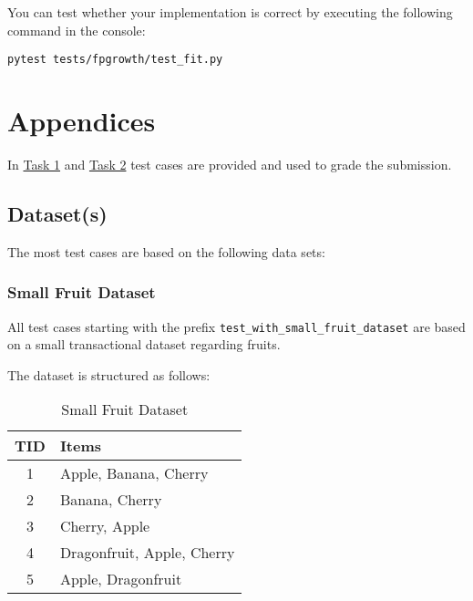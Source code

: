 \documentclass[
english,
smallborders
]{i6prcsht}
\begin{document}
You can test whether your implementation is correct by executing the following command in the console:

\vspace*{0.3cm}

\begin{lstlisting}
pytest tests/fpgrowth/test_fit.py
\end{lstlisting}











\newpage

\section*{Appendices}

In \hyperref[sec:task-one]{Task 1} and \hyperref[sec:task-two]{Task 2} test cases are provided and used to grade the submission.

\subsection*{Dataset(s)}

The most test cases are based on the following data sets:

\subsubsection*{Small Fruit Dataset}

All test cases starting with the prefix \texttt{test\_with\_small\_fruit\_dataset} are based on a small transactional dataset regarding fruits.

The dataset is structured as follows:

\vspace*{0.7cm}

\begin{table}[ht]
	\centering
	\begin{tabular}{|c|l|}
		\hline
		\textbf{TID} & \textbf{Items}             \\
		\hline
		1            & Apple, Banana, Cherry      \\
		\hline
		2            & Banana, Cherry             \\
		\hline
		3            & Cherry, Apple              \\
		\hline
		4            & Dragonfruit, Apple, Cherry \\
		\hline
		5            & Apple, Dragonfruit         \\
		\hline
	\end{tabular}
	\caption{Small Fruit Dataset}
	\label{tab:small-fruit-dataset}
\end{table}
\end{document}

